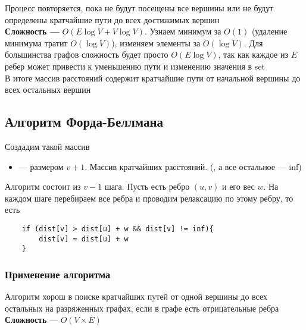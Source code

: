 \documentclass[a4paper]{article}
\begin{document}
\indent Процесс повторяется, пока не будут посещены все вершины или не будут определены кратчайшие пути до всех достижимых вершин\\[2mm]
\indent \textbf{Сложность —} $O(E\log{V} + V\log{V})$. Узнаем минимум за $O(1)$ (удаление минимума тратит $O(\log{V})$), изменяем элементы за $O(\log{V})$. Для большинства графов сложность будет просто $O(E\log{V})$, так как каждое из $E$ ребер может привести к уменьшению пути и изменению значения в set\\[2mm]
\indent В итоге массив расстояний содержит кратчайшие пути от начальной вершины до всех остальных вершин


\subsection{Алгоритм Форда-Беллмана}
Создадим такой массив
\begin{itemize}
    \item {} — размером $v+1$. Массив кратчайших расстояний. (, а все остальное — inf)
\end{itemize}
Алгоритм состоит из $v-1$ шага. Пусть есть ребро $(u,v)$ и его вес $w$. На каждом шаге перебираем все ребра и проводим релаксацию по этому ребру, то есть
\begin{lstlisting}
    if (dist[v] > dist[u] + w && dist[v] != inf){
        dist[v] = dist[u] + w
    }
\end{lstlisting}
\subsubsection*{Применение алгоритма}
Алгоритм хорош в поиске кратчайших путей от одной вершины до всех остальных на разряженных графах, если в графе есть отрицательные ребра\\[2mm]
\textbf{Сложность} — $O(V\times E)$
\end{document}
